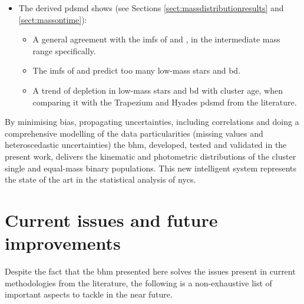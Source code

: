 \begin{itemize}
\begin{itemize}
\end{itemize}
\item The derived \acrfull{pdsmd} \cite[using an age of 120 \gls{myr} and the BT-Settl isochrone model of][]{Allard2012} shows (see Sections \ref{sect:massdistributionresults} and \ref{sect:massontime}):
\begin{itemize}
\item A general agreement with the \glspl{imf} of \citet{Chabrier2005} and \citet{Thies2007}, in the intermediate mass range specifically.
\item The \glspl{imf} of \citet{Chabrier2005} and \citet{Thies2007} predict too many low-mass stars and \acrfull{bd}.
\item A trend of depletion in low-mass stars and \gls{bd} with cluster age, when comparing it with the Trapezium and Hyades \gls{pdsmd} from the literature.
\end{itemize}
\end{itemize}

By minimising bias, propagating uncertainties, including correlations and doing a comprehensive modelling of the data particularities (missing values and heteroscedastic uncertainties) the \gls{bhm}, developed, tested and validated in the present work, delivers the kinematic and photometric distributions of the cluster single and equal-mass binary populations. This new intelligent system represents the state of the art in the statistical analysis of \glspl{nyc}.

\section{Current issues and future improvements}

Despite the fact that the \gls{bhm} presented here solves the issues present in current methodologies from the literature, the following is a non-exhaustive list of important aspects to tackle in the near future.

